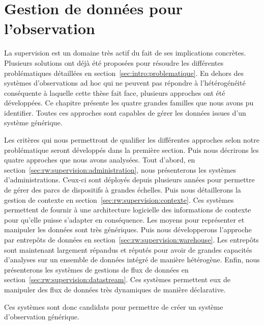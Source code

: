 \chapter{Gestion de données pour l'observation}
\minitoc

La supervision est un domaine très actif du fait de ses implications concrètes. Plusieurs solutions ont déjà été proposées pour résoudre les différentes problématiques détaillées en section~\ref{sec:intro:problematique}. En dehors des systèmes d'observations ad hoc qui ne peuvent pas répondre à l'hétérogénéité conséquente à laquelle cette thèse fait face, plusieurs approches ont été développées. Ce chapitre présente les quatre grandes familles que nous avons pu identifier. Toutes ces approches sont capables de gérer les données issues d'un système générique.

Les critères qui nous permettront de qualifier les différentes approches selon notre problématique seront développés dans la première section. Puis nous décrirons les quatre approches que nous avons analysées. Tout d'abord, en section~\ref{sec:rw:supervision:administration}, nous présenterons les systèmes d'administrations. Ceux-ci sont déployés depuis plusieurs années pour permettre de gérer des parcs de dispositifs à grandes échelles. Puis nous détaillerons la gestion de contexte en section~\ref{sec:rw:supervision:contexte}. Ces systèmes permettent de fournir à une architecture logicielle des informations de contexte pour qu'elle puisse s'adapter en conséquence. Les moyens pour représenter et manipuler les données sont très génériques. Puis nous développerons l'approche par entrepôts de données en section~\ref{sec:rw:supervision:warehouse}. Les entrepôts sont maintenant largement répandus et réputés pour avoir de grandes capacités d'analyses sur un ensemble de données intégré de manière hétérogène. Enfin, nous présenterons les systèmes de gestions de flux de données en section~\ref{sec:rw:supervision:datastream}. Ces systèmes permettent eux de manipuler des flux de données très dynamiques de manière déclarative.

Ces systèmes sont donc candidats pour permettre de créer un système d'observation générique.







